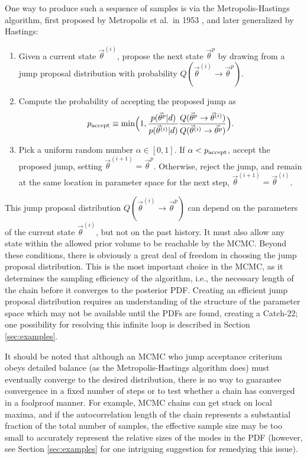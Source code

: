 \documentclass[prd,preprint]{revtex4}
\newcommand{\vtheta}{\vec{\theta}}
\newcommand{\be}{\begin{equation}}
\newcommand{\ee}{\end{equation}}
\begin{document}
One way to produce such a sequence of samples is via the Metropolis-Hastings algorithm, first proposed by Metropolis et al.~in 1953 \cite{Metropolis:1953}, and later generalized by Hastings:
\begin{enumerate}
  \item Given a current state $\vtheta^{(i)}$, propose the next state $\vtheta^p$ by drawing from a jump proposal distribution with probability $Q(\vtheta^{(i)} \to \vtheta^p)$.  
  \item Compute the probability of accepting the proposed jump as
\be
p_{\textnormal{accept}}  \equiv \min\Bigl(1,  \frac{p(\vtheta^p|d)}{p(\vtheta^{(i)}|d)} \frac{Q(\vtheta^p \to
        \vtheta^{(i)})}{Q(\vtheta^{(i)} \to \vtheta^p)} \Bigr).
\ee
\item Pick a uniform random number $\alpha \in [0,1]$.  If $\alpha<  p_{\textnormal{accept}}$, accept the proposed jump, setting $\vtheta^{(i+1)}=\vtheta^p$.  Otherwise, reject the jump, and remain at the same location in parameter space for the next step, $\vtheta^{(i+1)}=\vtheta^{(i)}$.
 \end{enumerate}
 
This jump proposal distribution $Q(\vtheta^{(i)} \to \vtheta^p)$ can depend on the parameters of the current state $\vtheta^{(i)}$, but not on the past history.  It must also allow any state within the allowed prior volume to be reachable by the MCMC.  Beyond these conditions, there is obviously a great deal of freedom in choosing the jump proposal distribution.  This is the most important choice in the MCMC, as it determines the sampling efficiency of the algorithm, i.e., the necessary length of the chain before it converges to the posterior PDF.  Creating an efficient jump proposal distribution requires an understanding of the structure of the parameter space which may not be available until the PDFs are found, creating a Catch-22; one possibility for resolving this infinite loop is described in Section \ref{sec:examples}.

It should be noted that although an MCMC who jump acceptance criterium obeys detailed balance (as the Metropolis-Hastings algorithm does) must eventually converge to the desired distribution, there is no way to guarantee convergence in a fixed number of steps or to test whether a chain has converged in a foolproof manner.  For example, MCMC chains can get stuck on local maxima, and if the autocorrelation length of the chain represents a substantial fraction of the total number of samples, the effective sample size may be too small to accurately represent the relative sizes of the modes in the PDF (however, see Section \ref{sec:examples} for one intriguing suggestion for remedying this issue).   
\end{document}
